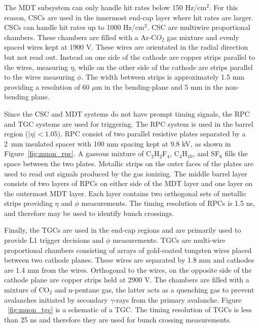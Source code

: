 The MDT subsystem can only handle hit rates below 150 Hz/cm$^{2}$. For this reason, CSCs are used in the innermost end-cap layer where hit rates are larger. CSCs can handle hit rates up to 1000 Hz/cm$^{2}$. CSC are multiwire proportional chambers. These chambers are filled with a Ar-C$O_{2}$ gas mixture and evenly spaced wires kept at 1900 V. These wires are orientated in the radial direction but not read out. Instead on one side of the cathode are copper strips parallel to the wires, measuring $\eta$, while on the other side of the cathode are strips parallel to the wires measuring $\phi$. The width between strips is approximately 1.5 mm providing a resolution of 60 $\mu$m in the bending-plane and 5 mm in the non-bending plane. 

Since the CSC and MDT systems do not have prompt timing signals, the RPC and TGC systems are used for triggering. The RPC system is used in the barrel region ($|\eta| < 1.05$). RPC consist of two parallel resistive plates separated by a 2~mm insulated spacer with 100 mm spacing kept at 9.8 kV, as shown in Figure~\ref{fig:muon_rpc}. A gaseous mixture of C$_{2}$H$_{2}$F$_{4}$, C$_{4}$H$_{10}$, and SF$_{6}$ fills the space between the two plates. Metallic strips on the outer faces of the plates are used to read out signals produced by the gas ionizing. The middle barrel layer consists of two layers of RPCs on either side of the MDT layer and one layer on the outermost MDT layer. Each layer contains two orthogonal sets of metallic strips providing $\eta$ and $\phi$ measurements. The timing resolution of RPCs is 1.5 ns, and therefore may be used to identify bunch crossings. 

Finally, the TGCs are used in the end-cap regions and are primarily used to provide L1 trigger decisions and $\phi$ measurements. TGCs are multi-wire proportional chambers consisting of arrays of gold-coated tungsten wires placed between two cathode planes. These wires are separated by 1.8 mm and cathodes are 1.4 mm from the wires. Orthogonal to the wires, on the opposite side of the cathode plane are copper strips held at 2900 V. The chambers are filled with a mixture of CO$_{2}$ and n-pentane gas, the latter acts as a quenching gas to prevent avalanches initiated by secondary $\gamma$-rays from the primary avalanche. Figure ~\ref{fig:muon_tgc} is a schematic of a TGC. The timing resolution of TGCs is less than 25 ns and therefore they are used for bunch crossing measurements. 

